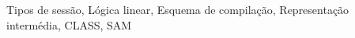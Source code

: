 \acresetall
\noindent Tipos de sessão, Lógica linear, Esquema de compilação, Representação intermédia, CLASS, SAM
